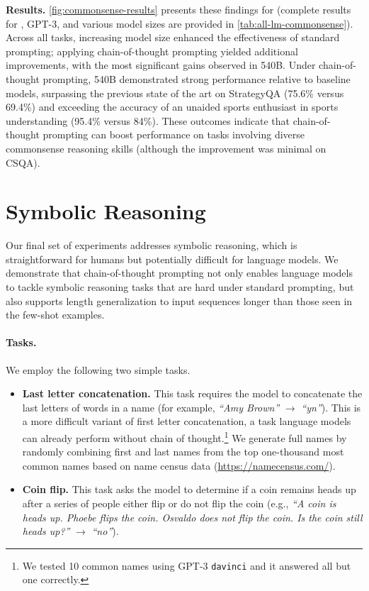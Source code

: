 \textbf{Results.}
\cref{fig:commonsense-results} presents these findings for \palm{} (complete results for \lamda{}, GPT-3, and various model sizes are provided in \cref{tab:all-lm-commonsense}).
Across all tasks, increasing model size enhanced the effectiveness of standard prompting; applying chain-of-thought prompting yielded additional improvements, with the most significant gains observed in \palm{} 540B. Under chain-of-thought prompting, \palm{} 540B demonstrated strong performance relative to baseline models, surpassing the previous state of the art on StrategyQA (75.6\% versus 69.4\%) and exceeding the accuracy of an unaided sports enthusiast in sports understanding (95.4\% versus 84\%).
These outcomes indicate that chain-of-thought prompting can boost performance on tasks involving diverse commonsense reasoning skills (although the improvement was minimal on CSQA).




\section{Symbolic Reasoning}\label{sec:symbolic-reasoning}
Our final set of experiments addresses symbolic reasoning, which is straightforward for humans but potentially difficult for language models. We demonstrate that chain-of-thought prompting not only enables language models to tackle symbolic reasoning tasks that are hard under standard prompting, but also supports length generalization to input sequences longer than those seen in the few-shot examples.

\paragraph{Tasks.}
We employ the following two simple tasks.

\begin{itemize}[leftmargin=*,topsep=0pt]
    \itemsep0em \item \textbf{Last letter concatenation.} This task requires the model to concatenate the last letters of words in a name (for example, \textit{``Amy Brown''} $\rightarrow$ \textit{``yn''}). 
    This is a more difficult variant of first letter concatenation, a task language models can already perform without chain of thought.\footnote{We tested 10 common names using GPT-3 \texttt{davinci} and it answered all but one correctly.} We generate full names by randomly combining first and last names from the top one-thousand most common names based on name census data ({\small{\url{https://namecensus.com/}}}).
    \item \textbf{Coin flip.} This task asks the model to determine if a coin remains heads up after a series of people either flip or do not flip the coin (e.g., \textit{``A coin is heads up. Phoebe flips the coin. Osvaldo does not flip the coin. Is the coin still heads up?''} $\rightarrow$ \textit{``no''}).
\end{itemize}

